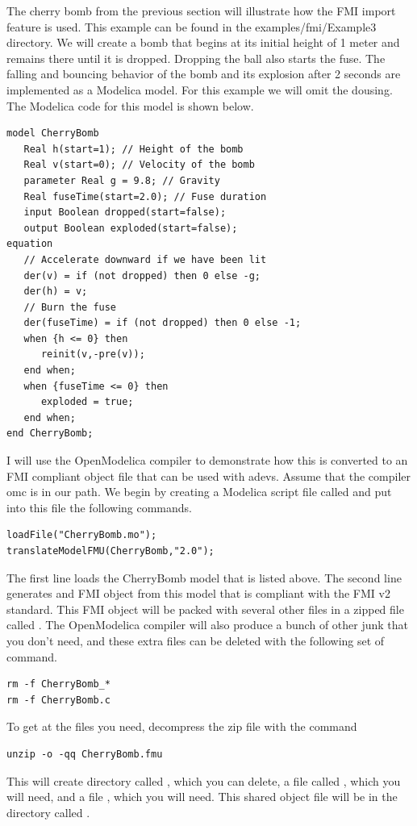 The cherry bomb from the previous section will illustrate how the FMI import feature is used. This example can be found in the examples/fmi/Example3 directory. We will create a bomb that begins at its initial height of 1 meter and remains there until it is dropped. Dropping the ball also starts the fuse. The falling and bouncing behavior of the bomb and its explosion after 2 seconds are implemented as a Modelica model. For this example we will omit the dousing. The Modelica code for this model is shown below.
\begin{verbatim}
model CherryBomb
   Real h(start=1); // Height of the bomb
   Real v(start=0); // Velocity of the bomb
   parameter Real g = 9.8; // Gravity
   Real fuseTime(start=2.0); // Fuse duration
   input Boolean dropped(start=false);
   output Boolean exploded(start=false);
equation
   // Accelerate downward if we have been lit
   der(v) = if (not dropped) then 0 else -g;
   der(h) = v;
   // Burn the fuse
   der(fuseTime) = if (not dropped) then 0 else -1;
   when {h <= 0} then
      reinit(v,-pre(v));
   end when;
   when {fuseTime <= 0} then
      exploded = true;
   end when;
end CherryBomb;
\end{verbatim}

I will use the OpenModelica compiler to demonstrate how this is converted to an FMI compliant object file that can be used with adevs. Assume that the compiler omc is in our path. We begin by creating a Modelica script file called  and put into this file the following commands.
\begin{verbatim}
loadFile("CherryBomb.mo");
translateModelFMU(CherryBomb,"2.0");
\end{verbatim}
The first line loads the CherryBomb model that is listed above. The second line generates and FMI object from this model that is compliant with the FMI v2 standard. This FMI object will be packed with several other files in a zipped file called . The OpenModelica compiler will also produce a bunch of other junk that you don't need, and these extra files can be deleted with the following set of command.
\begin{verbatim}
rm -f CherryBomb_*
rm -f CherryBomb.c
\end{verbatim}
To get at the files you need, decompress the zip file with the command
\begin{verbatim}
unzip -o -qq CherryBomb.fmu
\end{verbatim}
This will create directory called , which you can delete, a file called , which you will need, and a file , which you will need. This shared object file will be in the directory called .

